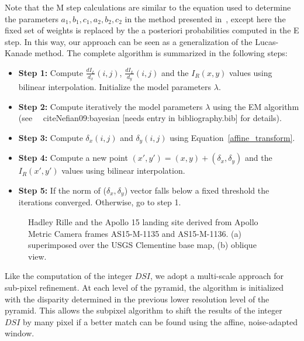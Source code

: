 Note that the M step calculations are similar to the equation used to
determine the parameters $a_1, b_1, c_1, a_2, b_2, c_2$ in the method
presented in~\cite{Stein06:attenuating}, except here the fixed set of
weights is replaced by the a posteriori probabilities computed in the
E step. In this way, our approach can be seen as a generalization of
the Lucas-Kanade method.  The complete algorithm is summarized in the following steps:
\begin{itemize}
\item {\bf Step 1:} Compute $\frac{dI_L}{d_x}(i,j)$, $\frac{dI_L}{d_y}(i,j)$ and the $I_R(x,y)$ values using bilinear interpolation. Initialize the model parameters $\lambda$.
\item {\bf Step 2:} Compute iteratively the model parameters $\lambda$ using the EM algorithm (see ~\ cite{Nefian09:bayesian} [needs entry in bibliography.bib] for details). 
\item {\bf Step 3:} Compute $\delta_x(i,j)$ and $\delta_y(i,j)$ using Equation~\ref{affine_transform}.
\item {\bf Step 4:} Compute a new point $(x', y') = (x, y) + (\delta_x, \delta_y)$ and the $I_R(x',y')$ values using bilinear interpolation.
\item {\bf Step 5:} If the norm of ($\delta_x, \delta_y$) vector falls below a fixed threshold the iterations converged. Otherwise, go to step 1.
\end{itemize}

\begin{figure}[bt]
  \begin{center}
    \caption{Hadley Rille and the Apollo 15 landing site derived from
      Apollo Metric Camera frames AS15-M-1135 and AS15-M-1136. (a)
      superimposed over the USGS Clementine base map, (b) oblique view.}
    \label{results_crater_img}
  \end{center}
\end{figure} 

Like the computation of the integer $DSI$, we adopt a multi-scale
approach for sub-pixel refinement. At each level of the pyramid, the
algorithm is initialized with the disparity determined in the previous
lower resolution level of the pyramid. This allows the subpixel
algorithm to shift the results of the integer $DSI$ by many pixel if
a better match can be found using the affine, noise-adapted window.



